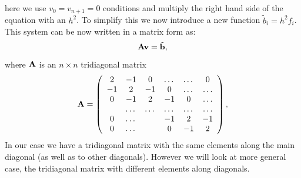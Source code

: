 \documentclass[10pt]{article}
\begin{document}
here we use $v_0 = v_{n+1} = 0$ conditions and multiply the right hand side of the equation with an $ h^2 $. To simplify this we now introduce a new function $\tilde{b}_i=h^2f_i$. This system can be now written in a matrix form as:
\begin{equation}\label{equ:three}
   {\bf A}{\bf v} = \tilde{{\bf b}},
\end{equation}
where ${\bf A}$ is an $n\times n$  tridiagonal matrix  
\begin{equation}
    {\bf A} = \left(\begin{array}{cccccc}
                           2& -1& 0 &\dots   & \dots &0 \\
                           -1 & 2 & -1 &0 &\dots &\dots \\
                           0&-1 &2 & -1 & 0 & \dots \\
                           & \dots   & \dots &\dots   &\dots & \dots \\
                           0&\dots   &  &-1 &2& -1 \\
                           0&\dots    &  & 0  &-1 & 2 \\
                      \end{array} \right),
\end{equation}
In our case we have a tridiagonal matrix with the same elements along the main diagonal (as well as to other diagonals). However we will look at more general case, the tridiagonal matrix with different elements along diagonals. 
\end{document}
